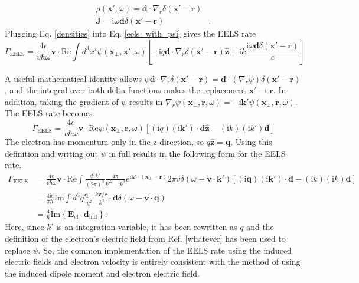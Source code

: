 \documentclass [11pt, proquest] {uwthesis}[2016/11/22]
\begin{document}
\begin{equation}
\begin{aligned}
\rho(\textbf{x}',\omega) = \textbf{d}\cdot\nabla_{r}\delta(\textbf{x}'-\textbf{r})&\\
\textbf{J} = \textrm{i}\omega\textbf{d}\delta(\textbf{x}'-\textbf{r})&.
\label{densities}
\end{aligned}
\end{equation} 
Plugging Eq. \ref{densities} into Eq. \ref{eels_with_psi} gives the EELS rate
\begin{equation}
\Gamma_{\textrm{EELS}} = \frac{4e}{v\hbar\omega}\textbf{v}\cdot\textrm{Re}\int d^3x' \psi(\textbf{x}_{\perp},\textbf{x}',\omega) \left[-\textrm{i}q \textbf{d}\cdot\nabla_{r}\delta(\textbf{x}'-\textbf{r})\hat{\textbf{z}} + \textrm{i}k\frac{\textrm{i}\omega\textbf{d}\delta(\textbf{x}'-\textbf{r})}{c}\right]
\label{eels_with_densities}
\end{equation}

A useful mathematical identity allows $\psi\textbf{d}\cdot\nabla_r\delta(\textbf{x}'-\textbf{r}) = \textbf{d}\cdot(\nabla_r\psi)\delta(\textbf{x}'-\textbf{r})$, and the integral over both delta functions makes the replacement $\textbf{x}' \rightarrow \textbf{r}$. In addition, taking the gradient of $\psi$ results in $\nabla_r\psi(\textbf{x}_{\perp},\textbf{r},\omega) = -\textrm{i}\textbf{k}'\psi(\textbf{x}_{\perp},\textbf{r},\omega)$. The EELS rate becomes
\begin{equation}
\Gamma_{\textrm{EELS}} = \frac{4e}{v\hbar\omega}\textbf{v}\cdot \textrm{Re}\psi(\textbf{x}_{\perp},\textbf{r},\omega) \left[(\textrm{i}q)(\textrm{i}\textbf{k}') \cdot \textbf{d}\hat{\textbf{z}} - (\textrm{i}k)(\textrm{i}k')\textbf{d}\right]
\end{equation}
The electron has momentum only in the z-direction, so $q\hat{\textbf{z}} = \textbf{q}$. Using this definition and writing out $\psi$ in full results in the following form for the EELS rate.
\begin{equation}
\begin{aligned}
\Gamma_{\textrm{EELS}} &= \frac{4e}{v\hbar\omega}\textbf{v}\cdot \textrm{Re}\int \frac{d^3k'}{(2\pi)^3} \frac{4\pi}{k'^2 - k^2} e^{\textrm{i}\textbf{k}'\cdot(\textbf{x}_{\perp}-\textbf{r})} 2\pi v \delta(\omega-\textbf{v}\cdot\textbf{k}') \left[(\textrm{i}\textbf{q})(\textrm{i}\textbf{k}') \cdot \textbf{d} - (\textrm{i}k)(\textrm{i}k)\textbf{d}\right]\\
&= \frac{4\textrm{i}e}{\pi\hbar} \textrm{Im}\int d^3q \frac{\textbf{q} - k\textbf{v}/c}{q^2 - k^2} \cdot \textbf{d} \delta(\omega - \textbf{v} \cdot \textbf{q})\\
&= \frac{4}{\hbar}\textrm{Im}\left\{ \textbf{E}_{\textrm{el}} \cdot \textbf{d}_{\textrm{ind}}\right\}.
\end{aligned}
\end{equation}
Here, since $k$' is an integration variable, it has been rewritten as $q$ and the definition of the electron's electric field from Ref. [whatever] has been used to replace $\psi$. So, the common implementation of the EELS rate using the induced electric fields and electron velocity is entirely consistent with the method of using the induced dipole moment and electron electric field.
\end{document}
